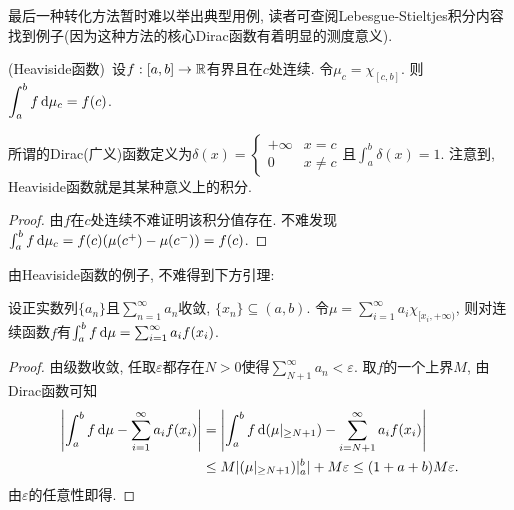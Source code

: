 最后一种转化方法暂时难以举出典型用例, 读者可查阅Lebesgue-Stieltjes积分内容找到例子(因为这种方法的核心Dirac函数有着明显的测度意义). 

\begin{example}
	(Heaviside函数)~设$f:[a,b] \to \mathbb{R}$有界且在$c$处连续. 令$\mu _c=\chi _{[c,b]}$. 则$\displaystyle \int_a^b f \mathop{}\!\mathrm{d} \mu _c = f(c)$. 
\end{example}
\begin{remark}
	所谓的Dirac(广义)函数定义为$\delta (x) = \begin{cases}
		+\infty & x=c \\ 0 & x \neq c
	\end{cases}$且$\int_a^b \delta (x) =1$. 注意到, Heaviside函数就是其某种意义上的积分. 
\end{remark}
\begin{proof}
	由$f$在$c$处连续不难证明该积分值存在. 不难发现$\int_a^b f \mathop{}\!\mathrm{d} \mu _c = f(c)(\mu (c^+)- \mu (c^-)) = f(c)$. 
\end{proof}






由Heaviside函数的例子, 不难得到下方引理: 

\begin{lemma}{}
	设正实数列$\{ a_n \}$且$\sum_{n=1}^{\infty} a_n$收敛, $\{ x_n \}\subseteq (a,b)$. 令$\mu = \sum_{i=1}^{\infty} a_i\chi _{[x_i,+\infty)}$, 则对连续函数$f$有$\int_a^b f \mathop{}\!\mathrm{d} \mu = \sum_{i=1}^{\infty} a_if(x_i)$. 
\end{lemma}
\begin{proof}
	由级数收敛, 任取$\varepsilon$都存在$N>0$使得$\sum_{N+1}^{\infty} a_n <\varepsilon$. 取$f$的一个上界$M$, 由Dirac函数可知
	\begin{align*}
		\left| \int_a^b f \mathop{}\!\mathrm{d} \mu - \sum_{i=1}^{\infty} a_if(x_i) \right| &= \left| \int_a^b f \mathop{}\!\mathrm{d} (\mu|_{\geq N+1}) - \sum_{i=N+1}^{\infty} a_if(x_i) \right| \\
		&\leq M|(\mu|_{\geq N+1})|_a^b| + M\varepsilon \leq (1+a+b)M\varepsilon .
	\end{align*}
	由$\varepsilon$的任意性即得. 
\end{proof}























